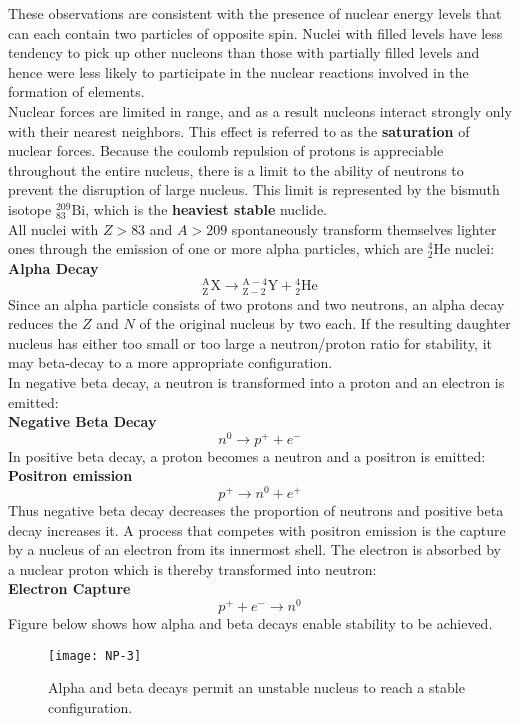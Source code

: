 These observations are consistent with the presence of nuclear energy levels that can each contain two particles of opposite spin. Nuclei with filled levels have less tendency to pick up other nucleons than those with partially filled levels and hence were less likely to participate in the nuclear reactions involved in the formation of elements.\\
Nuclear forces are limited in range, and as a result nucleons interact strongly only with their nearest neighbors. This effect is referred to as the \textbf{saturation} of nuclear forces. Because the coulomb repulsion of protons is appreciable throughout the entire nucleus, there is a limit to the ability of neutrons to prevent the disruption of large nucleus. This limit is represented by the bismuth isotope ${ }_{83}^{209} \mathrm{Bi}$, which is the \textbf{heaviest stable} nuclide.\\
All nuclei with $Z>83$ and $A>209$ spontaneously transform themselves lighter ones through the emission of one or more alpha particles, which are ${ }_2^4 \mathrm{He}$ nuclei:\\
\textbf{Alpha Decay }
$${ }_{\mathrm{Z}}^{\mathrm{A}} \mathrm{X} \rightarrow{ }_{\mathrm{Z}-2}^{\mathrm{A}-4} \mathrm{Y}+{ }_2^4 \mathrm{He}$$
Since an alpha particle consists of two protons and two neutrons, an alpha decay reduces the $Z$ and $N$ of the original nucleus by two each. If the resulting daughter nucleus has either too small or too large a neutron/proton ratio for stability, it may beta-decay to a more appropriate configuration.\\
In negative beta decay, a neutron is transformed into a proton and an electron is emitted:\\
\textbf{Negative Beta Decay}
$$
n^0 \rightarrow p^{+}+e^{-}
$$
In positive beta decay, a proton becomes a neutron and a positron is emitted:\\
\textbf{Positron emission}
$$
p^{+} \rightarrow n^0+e^{+}
$$
Thus negative beta decay decreases the proportion of neutrons and positive beta decay increases it. A process that competes with positron emission is the capture by a nucleus of an electron from its innermost shell. The electron is absorbed by a nuclear proton which is thereby transformed into neutron:\\
\textbf{Electron Capture}
$$
p^{+}+e^{-} \rightarrow n^0
$$
Figure below shows how alpha and beta decays enable stability to be achieved.
\begin{figure}[H]
	\centering
	\texttt{[image: NP-3]}
	\caption{Alpha and beta decays permit an unstable nucleus to reach a stable configuration.}
	\label{}
\end{figure}
